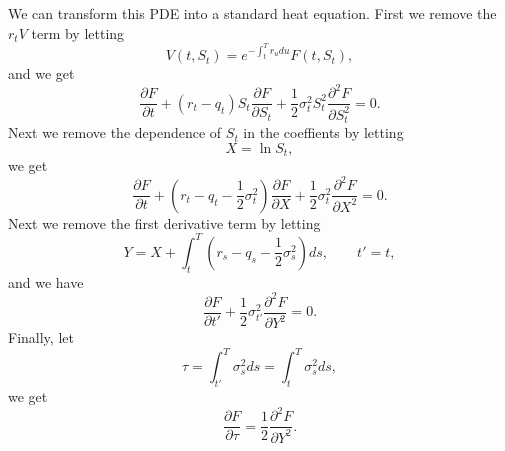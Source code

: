 We can transform this PDE into a standard heat equation. First we remove the
$r_t V$ term by letting
\[
  V(t,S_t) = e^{-\int_t^T r_u du} F(t,S_t),
\]
and we get
\[
  \frac{\partial F}{\partial t} + (r_t-q_t) S_t \frac{\partial F}{\partial S_t}
    + \frac{1}{2}\sigma_t^2 S_t^2 \frac{\partial^2 F}{\partial S_t^2} = 0.
\]
Next we remove the dependence of $S_t$ in the coeffients by letting
\[
  X = \ln S_t,
\]
we get
\[
  \frac{\partial F}{\partial t} + (r_t-q_t-\frac{1}{2}\sigma_t^2) \frac{\partial F}{\partial X}
    + \frac{1}{2}\sigma_t^2 \frac{\partial^2 F}{\partial X^2} = 0.
\]
Next we remove the first derivative term by letting
\[
  Y = X + \int_t^T (r_s-q_s-\frac{1}{2}\sigma_s^2) ds, \qquad t' = t,
\]
and we have
\[
  \frac{\partial F}{\partial t'} + \frac{1}{2}\sigma_{t'}^2 \frac{\partial^2 F}{\partial Y^2} = 0.
\]
Finally, let
\[
  \tau=\int_{t'}^T \sigma_s^2 ds = \int_t^T \sigma_s^2 ds,
\]
we get
\[
  \frac{\partial F}{\partial \tau} = \frac{1}{2} \frac{\partial^2 F}{\partial Y^2}.
\]

